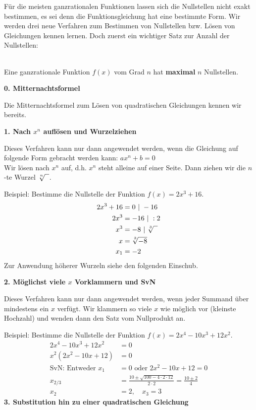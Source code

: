 Für die meisten ganzrationalen Funktionen lassen sich die Nullstellen nicht exakt bestimmen, es sei denn die Funktionsgleichung hat eine bestimmte Form. Wir werden drei neue Verfahren zum Bestimmen von Nullstellen bzw. Lösen von Gleichungen kennen lernen. Doch zuerst ein wichtiger Satz zur Anzahl der Nullstellen:

\begin{tcolorbox}\centering
	\textcolor{loestc}{\vspace{0.3cm}\\Eine ganzrationale Funktion \(f(x)\) vom Grad \(n\) hat \textbf{maximal} \(n\) Nullstellen.\\ \vspace{0.5cm}}
\end{tcolorbox}

\textbf{0. Mitternachtsformel}

Die Mitternachtsformel zum Lösen von quadratischen Gleichungen kennen wir bereits.

\textbf{1. Nach \(x^n\) auflösen und Wurzelziehen}

Dieses Verfahren kann nur dann angewendet werden, wenn die Gleichung auf folgende Form gebracht werden kann: \(ax^n+b=0\)\\
Wir lösen nach \(x^n\) auf, d.h. \(x^n\) steht alleine auf einer Seite. Dann ziehen wir die \(n\)-te Wurzel \(\sqrt[\leftroot{0}\uproot{2}n]{\phantom{x}}\).

Beispiel: Bestimme die Nullstelle der Funktion \(f(x)=2x^3+16\).
{\large\textcolor{loes}{\begin{align*}
		2x^3+16&=0\ \vert\ -16\\
		2x^3&=-16\ \vert\ :2\\
		x^3&=-8\ \vert\ \sqrt[\leftroot{0}\uproot{2}3]{\phantom{x}}\\
		x&=\sqrt[\leftroot{0}\uproot{2}3]{-8}\\
		x_1&=-2
\end{align*}}}
Zur Anwendung höherer Wurzeln siehe den folgenden Einschub.

\textbf{2. Möglichst viele \(x\) Vorklammern und SvN}

Dieses Verfahren kann nur dann angewendet werden, wenn jeder Summand über mindestens ein \(x\) verfügt. Wir klammern so viele \(x\) wie möglich vor (kleinste Hochzahl) und wenden dann den Satz vom Nullprodukt an.

Beispiel: Bestimme die Nullstelle der Funktion \(f(x)=2x^4-10x^3+12x^2\).
{\large\textcolor{loes}{\begin{align*}
		2x^4-10x^3+12x^2&=0\\
		x^2\left(2x^2-10x+12\right) &=0\\
		\text{SvN: Entweder }x_1&=0 \text{ oder }2x^2-10x+12=0\\
		x_{2/3}&=\frac{10\pm\sqrt{100-4\cdot 2\cdot 12}}{2\cdot 2}=\frac{10\pm 2}{4}\\
		x_2&=2,\quad x_3=3
\end{align*}}}\newpage
\textbf{3. Substitution hin zu einer quadratischen Gleichung}

